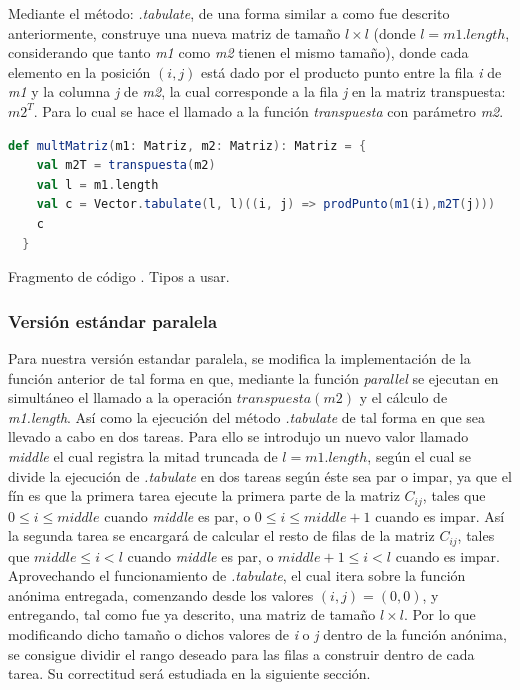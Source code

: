 \documentclass{article}
\newcounter{codesnippet}
\newcommand{\newcodesnippet}{%
  \stepcounter{codesnippet}%
}
\begin{document}
Mediante el método: \textit{.tabulate}, de una forma similar a como fue descrito anteriormente, construye una nueva matriz de tamaño \(l \times l\) (donde \(l = m1.length\), considerando que tanto \textit{m1} como \textit{m2} tienen el mismo tamaño), donde cada elemento en la posición \((i,j)\) está dado por el producto punto entre la fila \textit{i} de \textit{m1} y la columna \textit{j} de \textit{m2}, la cual corresponde a la fila \textit{j} en la matriz transpuesta: \(m2^T\). Para lo cual se hace el llamado a la función \textit{transpuesta} con parámetro \textit{m2}.\\

\newcodesnippet
\begin{lstlisting}[language=Scala]
  def multMatriz(m1: Matriz, m2: Matriz): Matriz = {
    val m2T = transpuesta(m2)
    val l = m1.length
    val c = Vector.tabulate(l, l)((i, j) => prodPunto(m1(i),m2T(j)))
    c
  }
\end{lstlisting}
\begin{center}
    \small{Fragmento de código \thecodesnippet. Tipos a usar.}
\end{center}
\subsubsection{Versión estándar paralela}

Para nuestra versión estandar paralela, se modifica la implementación de la función anterior de tal forma en que, mediante la función \textit{parallel} se ejecutan en simultáneo el llamado a la operación \(transpuesta(m2)\) y el cálculo de \textit{m1.length}. Así como la ejecución del método \textit{.tabulate} de tal forma en que sea llevado a cabo en dos tareas. Para ello se introdujo un nuevo valor llamado \textit{middle} el cual registra la mitad truncada de \(l = m1.length\), según el cual se divide la ejecución de \textit{.tabulate} en dos tareas según éste sea par o impar, ya que el fín es que la primera tarea ejecute la primera parte de la matriz \(C_{ij}\), tales que \(0 \leq i \leq middle\) cuando \textit{middle} es par, o \(0 \leq i \leq middle + 1\) cuando es impar. Así la segunda tarea se encargará de calcular el resto de filas de la matriz \(C_{ij}\), tales que \(middle \leq i < l\) cuando \textit{middle} es par, o \(middle + 1 \leq i < l\) cuando es impar. Aprovechando el funcionamiento de \textit{.tabulate}, el cual itera sobre la función anónima entregada, comenzando desde los valores \((i,j) = (0,0)\), y entregando, tal como fue ya descrito, una matriz de tamaño \(l \times l\). Por lo que modificando dicho tamaño o dichos valores de \textit{i} o \textit{j} dentro de la función anónima, se consigue dividir el rango deseado para las filas a construir dentro de cada tarea. Su correctitud será estudiada en la siguiente sección.\\
\end{document}
